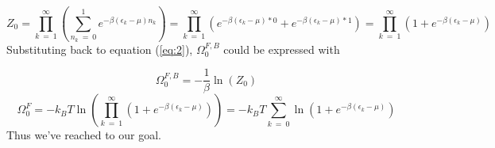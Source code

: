 \begin{equation} \label{eq:10}
Z_{0}
=
\prod_{k\ =\ 1}^{\infty}
\left(
\sum_{n_{k}\ =\ 0}^{1} e^{-\beta \left( \epsilon_{k} - \mu \right) n_{k}}
\right)
=
\prod_{k\ =\ 1}^{\infty}
\left(
e^{-\beta \left( \epsilon_{k} - \mu \right) * 0}
+
e^{-\beta \left( \epsilon_{k} - \mu \right) * 1}
\right)
=
\prod_{k\ =\ 1}^{\infty}
\left(
1
+
e^{-\beta \left( \epsilon_{k} - \mu \right)}
\right)
\end{equation}
Substituting back to equation (\ref{eq:2}), $\Omega_{0}^{F,B}$ could be expressed with

\begin{equation} \label{eq:11}
\Omega_{0}^{F,B}
=
- \frac{1}{\beta} \ln \left( Z_{0} \right)
\end{equation}
\begin{equation} \label{eq:12}
\Omega_{0}^{F}
=
-k_{B} T \ln \left(
\prod_{k\ =\ 1}^{\infty}
\left(
1
+
e^{-\beta \left( \epsilon_{k} - \mu \right)}
\right)
\right)
=
-k_{B} T \sum_{k\ =\ 0}^{\infty} \ln \left( 1 + e^{-\beta \left( \epsilon_{k} - \mu \right)} \right)
\end{equation}
Thus we've reached to our goal.